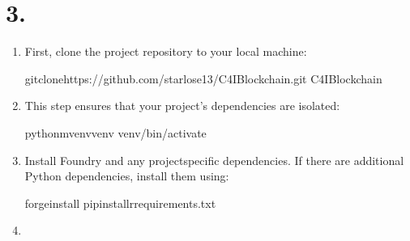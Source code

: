 \documentclass[a4paper,10pt,english]{sphinxmanual}
\begin{document}
\section{3. }
\label{\detokenize{quickstart:setting-up-your-environment}}\label{\detokenize{quickstart:setting-up-environment}}\begin{enumerate}
%
\item {} 
\sphinxAtStartPar
{}

\sphinxAtStartPar
First, clone the project repository to your local machine:

\begin{sphinxVerbatim}[commandchars=\\\{\}]
gitclonehttps://github.com/starlose13/C4I\PYGZhy{}Blockchain.git
C4I\PYGZhy{}Blockchain
\end{sphinxVerbatim}

\item {} 
\sphinxAtStartPar
{}

\sphinxAtStartPar
This step ensures that your project’s dependencies are isolated:

\begin{sphinxVerbatim}[commandchars=\\\{\}]
python\PYGZhy{}mvenvvenv
venv/bin/activate
\end{sphinxVerbatim}

\item {} 
\sphinxAtStartPar
{}

\sphinxAtStartPar
Install Foundry and any project\sphinxhyphen{}specific dependencies. If there are additional Python dependencies, install them using:

\begin{sphinxVerbatim}[commandchars=\\\{\}]
forgeinstall
pipinstall\PYGZhy{}rrequirements.txt
\end{sphinxVerbatim}

\item {} 
\sphinxAtStartPar
{}


\end{enumerate}
\end{document}
